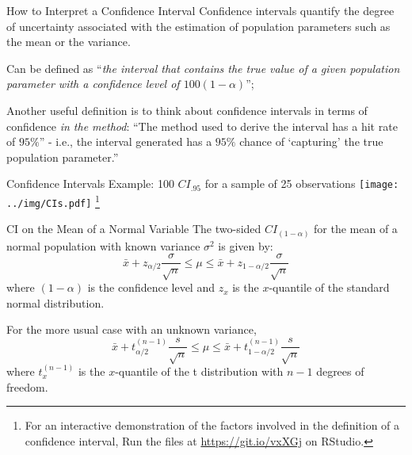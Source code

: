 
\begin{frame}{How to Interpret a Confidence Interval}
Confidence intervals quantify the degree of uncertainty associated with the estimation of population parameters such as the mean or the variance.\bigskip

Can be defined as ``\textit{the interval that contains the true value of a given population parameter with a confidence level of $100(1-\alpha)$}'';\bigskip

Another useful definition is to think about confidence intervals in terms of confidence \textit{in the method}: ``The method used to derive the interval has a hit rate of $95\%$'' - i.e., the interval generated has a $95\%$ chance of `capturing' the true population parameter.''
\end{frame}


\begin{frame}
{Confidence Intervals}
{Example: 100 $CI_{.95}$ for a sample of 25 observations}
\centering\texttt{[image: ../img/CIs.pdf]}
\footnote{For an interactive demonstration of the factors involved in the definition of a confidence interval, Run the files at \url{https://git.io/vxXGj} on RStudio.}
\end{frame}



\begin{frame}{CI on the Mean of a Normal Variable}
The two-sided $CI_{(1-\alpha)}$ for the mean of a normal population with known variance $\sigma^2$ is given by:
\begin{equation*}
\bar{x}+z_{\alpha/2}\frac{\sigma}{\sqrt{n}}\leq\mu\leq\bar{x}+z_{1-\alpha/2}\frac{\sigma}{\sqrt{n}}
\end{equation*}
\noindent where $(1-\alpha)$ is the confidence level and $z_{x}$ is the $x$-quantile of the standard normal distribution.
\bigskip

For the more usual case with an unknown variance,
\begin{equation*}
\bar{x}+t_{\alpha/2}^{(n-1)}\frac{s}{\sqrt{n}}\leq\mu\leq\bar{x}+t_{1-\alpha/2}^{(n-1)}\frac{s}{\sqrt{n}}
\end{equation*}
\noindent where $t_{x}^{(n-1)}$ is the $x$-quantile of the t distribution with $n-1$ degrees of freedom.
\end{frame}

